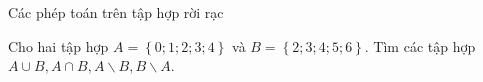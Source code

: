 \begin{dang}{Các phép toán trên tập hợp rời rạc}
\end{dang}
\begin{vd}%
	Cho hai tập hợp $A=\left\{0;1;2;3;4\right\}$ và $B=\left\{2;3;4;5;6\right\}$. Tìm các tập hợp $A\cup B, A\cap B, A\backslash B, B\backslash A$.
\end{vd}
